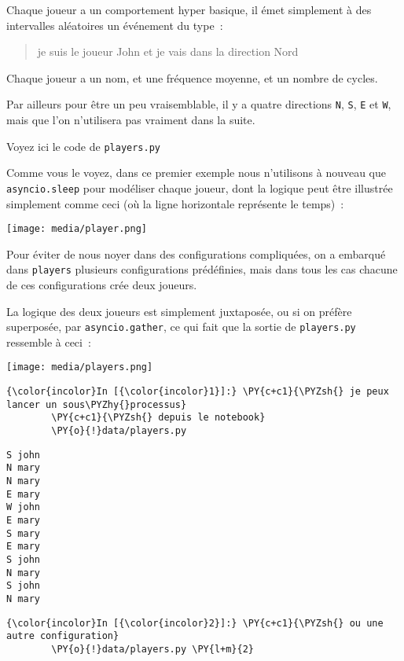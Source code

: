 Chaque joueur a un comportement hyper basique, il émet simplement à des
intervalles aléatoires un événement du type~:

\begin{quote}
je suis le joueur John et je vais dans la direction Nord
\end{quote}

Chaque joueur a un nom, et une fréquence moyenne, et un nombre de
cycles.

Par ailleurs pour être un peu vraisemblable, il y a quatre directions
\texttt{N}, \texttt{S}, \texttt{E} et \texttt{W}, mais que l'on
n'utilisera pas vraiment dans la suite.

    Voyez ici le code de \texttt{players.py}

    Comme vous le voyez, dans ce premier exemple nous n'utilisons à nouveau
que \texttt{asyncio.sleep} pour modéliser chaque joueur, dont la logique
peut être illustrée simplement comme ceci (où la ligne horizontale
représente le temps)~:

    \texttt{[image: media/player.png]}

    Pour éviter de nous noyer dans des configurations compliquées, on a
embarqué dans \texttt{players} plusieurs configurations prédéfinies,
mais dans tous les cas chacune de ces configurations crée deux joueurs.

    La logique des deux joueurs est simplement juxtaposée, ou si on préfère
superposée, par \texttt{asyncio.gather}, ce qui fait que la sortie de
\texttt{players.py} ressemble à ceci~:

    \texttt{[image: media/players.png]}

    \begin{Verbatim}[commandchars=\\\{\}]
{\color{incolor}In [{\color{incolor}1}]:} \PY{c+c1}{\PYZsh{} je peux lancer un sous\PYZhy{}processus}
        \PY{c+c1}{\PYZsh{} depuis le notebook}
        \PY{o}{!}data/players.py
\end{Verbatim}


    \begin{Verbatim}[commandchars=\\\{\}]
S john
N mary
N mary
E mary
W john
E mary
S mary
E mary
S john
N mary
S john
N mary

    \end{Verbatim}

    \begin{Verbatim}[commandchars=\\\{\}]
{\color{incolor}In [{\color{incolor}2}]:} \PY{c+c1}{\PYZsh{} ou une autre configuration}
        \PY{o}{!}data/players.py \PY{l+m}{2}
\end{Verbatim}


